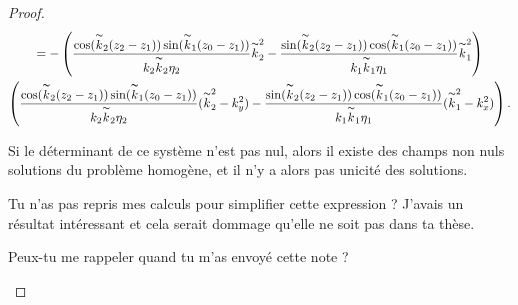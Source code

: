 \begin{proof}
      \begin{multline*}
        =-\left(\alp \kk_2^2 - \bet \kk_1^2\right)
        \\
        \left(\alp(\kk_2^2-k_y^2)-\bet(\kk_1^2-k_x^2)\right).
      \end{multline*}


      Si le déterminant de ce système n'est pas nul, alors il existe des champs non nuls solutions du problème homogène, et il n'y a alors pas unicité des solutions.

      \begin{REM}
        Tu n'as pas repris mes calculs pour simplifier cette expression ? J'avais un résultat intéressant et cela serait dommage qu'elle ne soit pas dans ta thèse.
      \end{REM}
      \begin{REP}
        Peux-tu me rappeler quand tu m'as envoyé cette note ?
      \end{REP}

    \end{proof}
